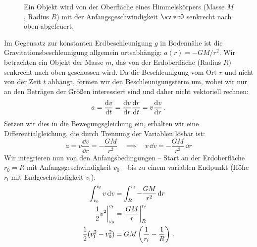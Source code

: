 \begin{figure}[htb]
    \caption{Ein Objekt wird von der Oberfläche eines Himmelskörpers (Masse $M$, Radius $R$) mit der Anfangsgeschwindigkeit $\protect\ivecS{v}{0}$ senkrecht nach oben abgefeuert.}\label{fig: zweite_kosmische_geschwindigkeit}
\end{figure}
Im Gegensatz zur konstanten Erdbeschleunigung $g$ in Bodennähe ist die Gravitationsbeschleunigung allgemein ortsabhängig: $a(r) = -GM/r^2$. Wir betrachten ein Objekt der Masse $m$, das von der Erdoberfläche (Radius $R$) senkrecht nach oben geschossen wird. Da die Beschleunigung vom Ort $r$ und nicht von der Zeit $t$ abhängt, formen wir den Beschleunigungsterm um, wobei wir nur an den Beträgen der Größen interessiert sind und daher nicht vektoriell rechnen:
\begin{equation}\label{eq: a_v_dv_dr}
    a = \frac{\mathrm{d} v}{\mathrm{d} t} = \frac{\mathrm{d} v}{\mathrm{d} r} \frac{\mathrm{d} r}{\mathrm{d} t} = v \frac{\mathrm{d} v}{\mathrm{d} r} \,.  
\end{equation}
Setzen wir dies in die Bewegungsgleichung ein, erhalten wir eine Differentialgleichung, die durch Trennung der Variablen lösbar ist:
\begin{equation}\label{eq: dgl_flucht}
    a= v \frac{\dd v}{\dd r} = -\frac{GM}{r^2} \quad \implies \quad v \, \dd v = -\frac{GM}{r^2} \, \dd r
\end{equation}
Wir integrieren nun von den Anfangsbedingungen -- Start an der Erdoberfläche $r_0 = R$ mit Anfangsgeschwindigkeit $v_0$ -- bis zu einem variablen Endpunkt (Höhe $r_\text{f}$ mit Endgeschwindigkeit $v_\text{f}$): 
\begin{align}
    \int_{v_0}^{v_{\text{f}}} v \, \mathrm{d} v &= \int_{R}^{r_{\text{f}}} -\frac{GM}{r^2} \, \mathrm{d} r \\
    \left. \frac{1}{2} v^2 \right|_{v_0}^{v_{\text{f}}} &= \left. \frac{GM}{r} \right|_{R}^{r_{\text{f}}} \\
    \frac{1}{2}(v_{\text{f}}^2 - v_0^2) &= GM \left( \frac{1}{r_{\text{f}}} - \frac{1}{R} \right) \,.
\end{align}
